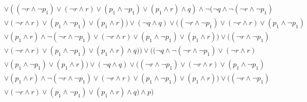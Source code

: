 \documentclass[10pt,letterpaper,fleqn]{article}
\begin{document}
\begin{enumerate}
\begin{enumerate}
\begin{equation*}
\begin{split}
                    \\& \vee ((\neg r \wedge \neg p_1) \vee (\neg r \wedge r) \vee (p_1 \wedge \neg p_1) \vee (p_1 \wedge r) \wedge q) \wedge \neg (\neg q \wedge \neg (\neg r \wedge \neg p_1) 
                    \\& \vee (\neg r \wedge r) \vee (p_1 \wedge \neg p_1) \vee (p_1 \wedge r)) \vee (\neg q \wedge q) \vee ((\neg r \wedge \neg p_1) \vee (\neg r \wedge r) \vee (p_1 \wedge \neg p_1) 
                    \\& \vee (p_1 \wedge r) \wedge \neg (\neg r \wedge \neg p_1) \vee (\neg r \wedge r) \vee (p_1 \wedge \neg p_1) \vee (p_1 \wedge r)) \vee ((\neg r \wedge \neg p_1) 
                    \\& \vee (\neg r \wedge r) \vee (p_1 \wedge \neg p_1) \vee (p_1 \wedge r) \wedge q)) \vee ((\neg q \wedge \neg (\neg r \wedge \neg p_1) \vee (\neg r \wedge r) 
                    \\& \vee (p_1 \wedge \neg p_1) \vee (p_1 \wedge r)) \vee (\neg q \wedge q) \vee ((\neg r \wedge \neg p_1) \vee (\neg r \wedge r) \vee (p_1 \wedge \neg p_1) 
                    \\& \vee (p_1 \wedge r) \wedge \neg (\neg r \wedge \neg p_1) \vee (\neg r \wedge r) \vee (p_1 \wedge \neg p_1) \vee (p_1 \wedge r)) \vee ((\neg r \wedge \neg p_1) 
                    \\& \vee (\neg r \wedge r) \vee (p_1 \wedge \neg p_1) \vee (p_1 \wedge r) \wedge q) \wedge p)
                    \\&
                \end{split}
            \end{equation*}
            
        \end{enumerate}
        

\end{enumerate}
\end{document}
